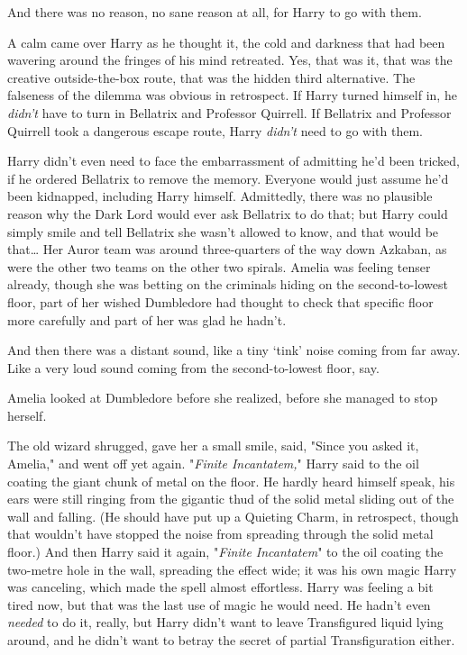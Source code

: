And there was no reason, no sane reason at all, for Harry to go with them.

A calm came over Harry as he thought it, the cold and darkness that had been
wavering around the fringes of his mind retreated. Yes, that was it, that was
the creative outside-the-box route, that was the hidden third alternative. The
falseness of the dilemma was obvious in retrospect. If Harry turned himself in,
he \emph{didn’t} have to turn in Bellatrix and Professor Quirrell. If Bellatrix
and Professor Quirrell took a dangerous escape route, Harry \emph{didn’t} need
to go with them.

Harry didn’t even need to face the embarrassment of admitting he’d been
tricked, if he ordered Bellatrix to remove the memory. Everyone would just
assume he’d been kidnapped, including Harry himself. Admittedly, there was no
plausible reason why the Dark Lord would ever ask Bellatrix to do that; but
Harry could simply smile and tell Bellatrix she wasn’t allowed to know, and
that would be that…
\later
Her Auror team was around three-quarters of the way down Azkaban, as were
the other two teams on the other two spirals. Amelia was feeling tenser
already, though she was betting on the criminals hiding on the second-to-lowest
floor, part of her wished Dumbledore had thought to check that specific floor
more carefully and part of her was glad he hadn’t.

And then there was a distant sound, like a tiny ‘tink’ noise coming from far
away. Like a very loud sound coming from the second-to-lowest floor, say.

Amelia looked at Dumbledore before she realized, before she managed to stop
herself.

The old wizard shrugged, gave her a small smile, said, "Since you asked it,
Amelia," and went off yet again.
\later
"\emph{Finite Incantatem,}" Harry said to the oil coating the giant chunk of
metal on the floor. He hardly heard himself speak, his ears were still ringing
from the gigantic thud of the solid metal sliding out of the wall and falling.
(He should have put up a Quieting Charm, in retrospect, though that wouldn’t
have stopped the noise from spreading through the solid metal floor.) And then
Harry said it again, "\emph{Finite Incantatem}" to the oil coating the
two-metre hole in the wall, spreading the effect wide; it was his own magic
Harry was canceling, which made the spell almost effortless. Harry was feeling
a bit tired now, but that was the last use of magic he would need. He hadn’t
even \emph{needed} to do it, really, but Harry didn’t want to leave
Transfigured liquid lying around, and he didn’t want to betray the secret of
partial Transfiguration either.

